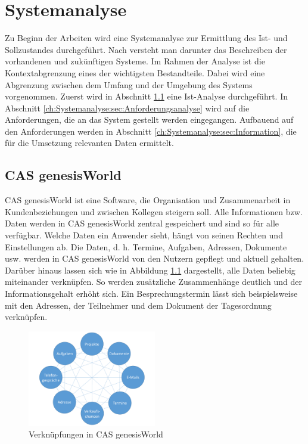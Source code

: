 
\chapter{Systemanalyse}
\label{ch:Systemanalyse}

Zu Beginn der Arbeiten wird eine Systemanalyse zur Ermittlung des Ist- und Sollzustandes durchgeführt. Nach \cite{SWB-380277719} versteht man darunter das Beschreiben der vorhandenen und zukünftigen Systeme. Im Rahmen der Analyse ist die Kontextabgrenzung eines der wichtigsten Bestandteile. Dabei wird eine Abgrenzung zwischen dem Umfang und der Umgebung des Systems vorgenommen. Zuerst wird in Abschnitt \ref{ch:Systemanalyse:sec:genesisWorld} eine Ist-Analyse durchgeführt. In Abschnitt \ref{ch:Systemanalyse:sec:Anforderungsanalyse} wird auf die Anforderungen, die an das System gestellt werden eingegangen. Aufbauend auf den Anforderungen werden in Abschnitt \ref{ch:Systemanalyse:sec:Information}, die für die Umsetzung relevanten Daten ermittelt. 

\section{CAS genesisWorld}
\label{ch:Systemanalyse:sec:genesisWorld}

CAS genesisWorld ist eine Software, die Organisation und Zusammenarbeit in Kundenbeziehungen und zwischen Kollegen steigern soll. Alle Informationen bzw. Daten werden in CAS genesisWorld zentral gespeichert und sind so für alle verfügbar. Welche Daten ein Anwender sieht, hängt von seinen Rechten und Einstellungen ab. Die Daten, d. h. Termine, Aufgaben, Adressen, Dokumente usw. werden in CAS genesisWorld von den Nutzern gepflegt und aktuell gehalten. Darüber hinaus lassen sich wie in Abbildung \ref{picGwCon} dargestellt, alle Daten beliebig miteinander verknüpfen. So werden zusätzliche Zusammenhänge deutlich und der Informationsgehalt erhöht sich. Ein Besprechungstermin lässt sich beispielsweise mit den Adressen, der Teilnehmer und dem Dokument der Tagesordnung verknüpfen.

\begin{figure}[H]
	\centering
  \includegraphics[width=0.5\textwidth, width=0.5\textwidth]{pics/CAS_connections.pdf}
	\caption{Verknüpfungen in CAS genesisWorld}
	\label{picGwCon}
\end{figure}

